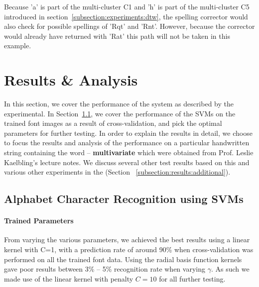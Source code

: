 \documentclass[12pt]{article}
\begin{document}
	Because 'a' is part of the multi-cluster C1 and 'h' is part of the multi-cluster C5 introduced in section~\ref{subsection:experiments:dtw}, the spelling corrector would also check for possible spellings of 'Rqt' and 'Rnt'. However, because the corrector would already have returned with 'Rat' this path will not be taken in this example.	
	
\section{Results \& Analysis}
\label{section:results}
In this section, we cover the performance of the system as described by the experimental. In Section~\ref{subsubsection:analysis:svm}, we cover the performance of the SVMs on the trained font images as a result of cross-validation, and pick the optimal parameters for further testing. In order to explain the results in detail, we choose to focus the results and analysis of the performance on a particular handwritten string containing the word -- \textbf{multivariate} which were obtained from Prof. Leslie Kaelbling's lecture notes.  We discuss several other test results based on this and various other experiments in the (Section ~\ref{subsection:results:additional}).
	
	\subsection{Alphabet Character Recognition using SVMs}
	\label{subsubsection:analysis:svm}
	
	\paragraph{Trained Parameters}
	From varying the various parameters, we achieved the best results using a linear kernel with C=1, with a prediction rate of around 90\% when cross-validation was performed on all the trained font data. Using the radial basis function kernels gave poor results between 3\% -- 5\% recognition rate when varying $\gamma$. As such we made use of the linear kernel with penalty $C=10$ for all further testing.
	
\end{document}
